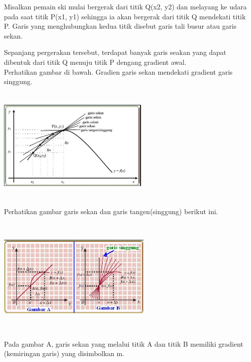 \documentclass[11pt,fleqn]{book} %
\begin{document}
\noindent 
Misalkan pemain ski mulai bergerak dari titik Q(x2, y2) dan melayang ke udara pada saat titik P(x1, y1) sehingga ia akan bergerak dari titik Q mendekati titik P. Garis yang menghubungkan kedua titik disebut garis tali busur atau garis sekan.

\noindent 
Sepanjang pergerakan tersebut, terdapat banyak garis seakan yang dapat dibentuk dari titik Q menuju titik P dengang gradient awal.\\

\noindent 
Perhatikan gambar di bawah. Gradien garis sekan mendekati gradient garis singgung.

\noindent 
\begin{center}
\noindent \includegraphics*[width=2.90in, height=2.19in, keepaspectratio=false, trim=0.00in 0.11in 0.00in 0.00in]{Pictures/TurunanFungsi3.JPG}\\
\end{center}

\noindent 
Perhatikan gambar garis sekan dan garis tangen(singgung) berikut ini.

\noindent 
\begin{center}
\noindent \includegraphics*[width=2.95in, height=2.25in, keepaspectratio=false, trim=0.00in 0.11in 0.00in 0.00in]{Pictures/TurunanFungsi4.JPG}
\end{center}

\noindent 
Pada gambar A, garis sekan yang melalui titik A dan titik B memiliki gradient (kemiringan garis) yang disimbolkan m.
\end{document}
